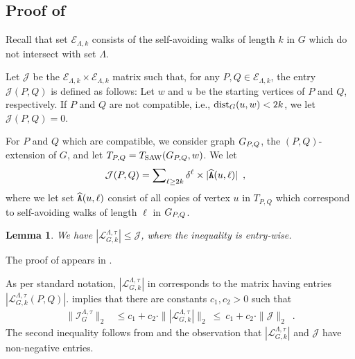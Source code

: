 \documentclass[11pt,reqno]{amsart}
\numberwithin{equation}{section}
\newtheorem{lemma}[theorem]{Lemma}
\newcommand{\cE}{{\mathcal{E}}}
\newcommand{\cI}{{\mathcal{I}}}
\newcommand{\cL}{{\mathcal{L}}}
\newcommand{\applegreen}[1]{ {\color{applegreen}#1}}
\newcommand{\amethyst}[1]{{\color{amethyst}#1} }
\newcommand{\blue}[1]{{\color{blue}#1}}
\newcommand{\bluepigment}[1]{{\color{blue(pigment)}#1}}
\newcommand{\goldenbrown}[1]{{\color{goldenbrown}#1}}
\newcommand{\iris}[1]{{\color{iris}#1}}
\newcommand{\red}[1]{{\color{red}#1}}
\newcommand{\dist}{{\rm dist}}
\newcommand{\ExtV}{\iris{\cE}}
\newcommand{\Tsaw}{T_{\rm SAW}}
\newcommand{\scp}{\widehat{\tt A}}
\newcommand{\infmatrix}{\cI}
\newcommand{\norm}[2]{\goldenbrown{\|} #1 \goldenbrown{\|}_{#2}}
\newcommand{\abs}[1]{\blue{|}#1\blue{|}}
\renewcommand{\applegreen}[1]{#1}
\renewcommand{\amethyst}[1]{#1}
\renewcommand{\blue}[1]{#1}
\renewcommand{\bluepigment}[1]{#1}
\renewcommand{\goldenbrown}[1]{#1}
\renewcommand{\iris}[1]{#1}
\renewcommand{\red}[1]{#1}
\newcommand{\kk}{\bluepigment{k}}
\newcommand{\kell}{{\color{green(pigment)}\ell}}%
\newcommand{\kP}{\goldenbrown{P}}
\newcommand{\kQ}{\amethyst{Q}}
\newcommand{\ku}{\red{u}}
\newcommand{\kw}{\blue{w}}
\renewcommand{\kk}{k}
\renewcommand{\kell}{\ell}
\renewcommand{\kP}{P}
\renewcommand{\kQ}{Q}
\renewcommand{\ku}{u}
\renewcommand{\kw}{w}
\newcommand{\infmatrixB}{\mathcal{J}}
\newcommand{\ExtdInfMatrixF}{\applegreen{\cL}^{\Lambda,\tau}_{G,\kk}}
\begin{document}
\subsection{Proof of }\label{sec:thrm:L2InflRedux2KNBTM}
Recall that set $\ExtV_{\Lambda,\kk}$ consists of the self-avoiding walks of length $\kk$ in $G$
which do not intersect with set $\Lambda$. 



Let $\infmatrixB$ be the $\ExtV_{\Lambda,k}\times \ExtV_{\Lambda,k}$ matrix 
such that, for any $\kP,\kQ\in \ExtV_{\Lambda, \kk}$, the entry $\infmatrixB(\kP,\kQ)$ is defined as follows:
Let $\kw$ and $\ku$ be the starting vertices of $\kP$ and $\kQ$, respectively.
If $\kP$ and $\kQ$ are not compatible, i.e., $\dist_G(\ku,\kw)< 2\kk$, we let $\infmatrixB(\kP,\kQ)=0$. 



For $\kP$ and $\kQ$ which are compatible, we consider graph $\gext{G}{\kP,\kQ}$, the $(\kP,\kQ)$-extension of $G$,
and let $T_{\kP,\kQ}=\Tsaw(\gext{G}{\kP,\kQ},\kw)$. We let
\begin{align}\nonumber
\infmatrixB(\kP,\kQ)&= \sum\nolimits_{\kell \geq 2\kk}\delta^{\kell}\times \abs{ \scp(\ku,\kell)} \enspace,
\end{align}
where   we let set $\scp(\ku,\kell)$ consist of all copies of vertex  $\ku$ in $T_{\kP,\kQ}$ which correspond to 
self-avoiding walks of length  $\kell$ in $\gext{G}{\kP,\kQ}$.  

 

\begin{lemma} \label{lemma:eq:CLVsCJEntrywise}
We have $\abs{\ExtdInfMatrixF} \leq \infmatrixB$,  where the inequality is entry-wise. 
\end{lemma}

The proof of  appears in .

As per standard notation, $\abs{\ExtdInfMatrixF}$ in  corresponds 
to the matrix having entries $\abs{\ExtdInfMatrixF(\kP,\kQ)}$. 
%
 implies that there are constants $c_1,c_2>0$ such that
\begin{align}
\norm{ \infmatrix^{\Lambda,\tau}_G}{2}  &\leq c_1+ c_2 \cdot \norm{\abs{\ExtdInfMatrixF}}{2}  
\ \leq \   c_1+ c_2 \cdot \norm{ \infmatrixB}{2}  \enspace. \label{eq:IVsJ2Norm}
\end{align}
The second inequality follows from  and the observation that 
$\abs{\ExtdInfMatrixF}$ and $\infmatrixB$ have non-negative entries. 
\end{document}
